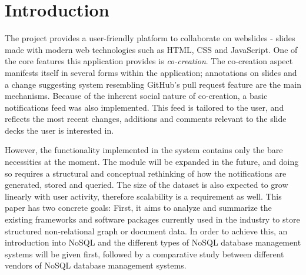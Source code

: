 \documentclass[fleqn,10pt]{voorstel}
\affiliation{\textbf{Contact:} \href{mailto:florian@floriandejonckheere.be}{florian@floriandejonckheere.be}}
\begin{document}
\flushbottom %
\maketitle %
\tableofcontents %
\thispagestyle{empty} %



\section{Introduction} %
\label{sec:introduction}


The \textcite{OpenWebslides} project provides a user-friendly platform to collaborate on webslides - slides made with modern web technologies such as HTML, CSS and JavaScript. One of the core features this application provides is \emph{co-creation}. The co-creation aspect manifests itself in several forms within the application; annotations on slides and a change suggesting system resembling GitHub's pull request feature are the main mechanisms. Because of the inherent social nature of co-creation, a basic notifications feed was also implemented. This feed is tailored to the user, and reflects the most recent changes, additions and comments relevant to the slide decks the user is interested in.

However, the functionality implemented in the system contains only the bare necessities at the moment. The module will be expanded in the future, and doing so requires a structural and conceptual rethinking of how the notifications are generated, stored and queried. The size of the dataset is also expected to grow linearly with user activity, therefore scalability is a requirement as well.
This paper has two concrete goals: First, it aims to analyze and summarize the existing frameworks and software packages currently used in the industry to store structured non-relational graph or document data. In order to achieve this, an introduction into NoSQL and the different types of NoSQL database management systems will be given first, followed by a comparative study between different vendors of NoSQL database management systems.
\end{document}
